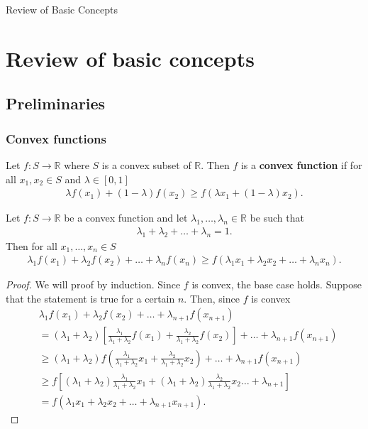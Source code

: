 \documentclass{memoir}
\begin{document}
\pagestyle{empty}
\begingroup
    {\hfill \HUGE Review of Basic Concepts}
\endgroup

\tableofcontents
\chapter{Review of basic concepts}
\section{Preliminaries}
\subsection{Convex functions}
\begin{definition}
    Let $f:S\to \mathbb{R}$ where $S$ is a convex subset of $\mathbb{R}$. Then $f$ is a \textbf{convex function} if for all $x_1,x_2 \in S$ and $\lambda \in [0,1]$
    \begin{align*}
        \lambda f(x_1) + (1- \lambda)f(x_2) \ge f( \lambda x_1 + (1- \lambda) x_2).
    \end{align*}
\end{definition}

\begin{theorem}
    Let $f:S \to \mathbb{R}$ be a convex function and let $\lambda_1,\ldots,\lambda_n \in \mathbb{R}$ be such that
    \begin{align*}
        \lambda_1 + \lambda_2 + \ldots + \lambda_n = 1.
    \end{align*}
    Then for all $x_1,\ldots,x_n \in S$
    \begin{align*}
        \lambda_1 f(x_1) + \lambda_2 f(x_2) + \ldots + \lambda_n f(x_n) \ge f(\lambda_1 x_1 + \lambda_2 x_2 + \ldots + \lambda_n x_n).
    \end{align*}
\end{theorem}
\begin{proof}
    We will proof by induction. Since $f$ is convex, the base case holds. Suppose that the statement is true for a certain $n$. Then, since $f$ is convex
    \begin{align*}
        &\lambda_1 f(x_1) + \lambda_2 f(x_2) + \ldots + \lambda_{n+1} f(x_{n+1}) \\
        &= (\lambda_1+\lambda_2)\left[\frac{\lambda_1}{\lambda_1 + \lambda_2} f(x_1) + \frac{\lambda_2}{\lambda_1+\lambda_2}f(x_2)\right] + \ldots + \lambda_{n+1} f(x_{n+1})  \\
        &\ge (\lambda_1 + \lambda_2)f\left( \frac{\lambda_1}{\lambda_1 + \lambda_2} x_1 + \frac{\lambda_2}{\lambda_1+\lambda_2}x_2\right) + \ldots + \lambda_{n+1} f(x_{n+1}) \\
        &\ge f\left[(\lambda_1 + \lambda_2) \frac{\lambda_1}{\lambda_1 + \lambda_2} x_1 + (\lambda_1 + \lambda_2)\frac{\lambda_2}{\lambda_1+\lambda_2}x_2\ldots + \lambda_{n+1}\right] \\
        &= f(\lambda_1 x_1 + \lambda_2 x_2 + \ldots + \lambda_{n+1} x_{n+1}).
    \end{align*}
\end{proof}
\end{document}
